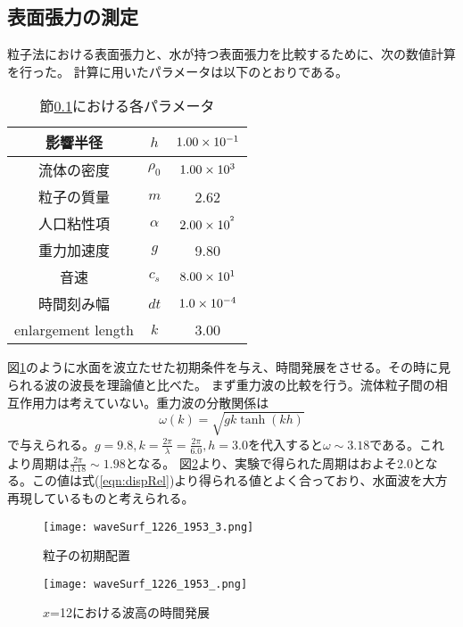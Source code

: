 \documentclass[]{jsarticle}
\begin{document}
\subsection{表面張力の測定}
\label{subsec:surfaceCoef}
粒子法における表面張力と、水が持つ表面張力を比較するために、次の数値計算を行った。
計算に用いたパラメータは以下のとおりである。
\begin{table}[h]
  \caption{節\ref{subsec:surfaceCoef}における各パラメータ}
  \begin{center}
    \begin{tabular}{|c|c|c|}\hline
      影響半径&$h$&$\rm{1.00\times10^{-1}}$ \\ \hline
      流体の密度&$\rho_0$&$\rm{1.00\times10^3}$ \\ \hline
      粒子の質量&$m$&2.62 \\ \hline
      人口粘性項&$\alpha$&$\rm{2.00\times10^{^2}}$ \\ \hline
      重力加速度&$g$&9.80 \\ \hline
      音速&$c_s$&$\rm{8.00\times10^1}$ \\ \hline
      時間刻み幅&$dt$&$\rm{1.0\times10^{-4}}$ \\ \hline
      enlargement length&$k$&3.00 \\ \hline
    \end{tabular}
  \end{center}
\end{table}

図\ref{fig:waveSurfInit}のように水面を波立たせた初期条件を与え、時間発展をさせる。その時に見られる波の波長を理論値と比べた。
まず重力波の比較を行う。流体粒子間の相互作用力は考えていない。重力波の分散関係は
\begin{equation}
  \label{eqn:dispRel}
  \omega(k)=\sqrt{gk \tanh (kh)}
\end{equation}
で与えられる\cite{tatsumiKiso}。$g=9.8, k=\frac{2\pi}{\lambda}=\frac{2\pi}{6.0}, h=3.0$を代入すると$\omega\sim3.18$である。これより周期は$\frac{2\pi}{3.18}\sim1.98$となる。
図\ref{fig:waveSurfEvol}より、実験で得られた周期はおよそ2.0となる。この値は式(\ref{eqn:dispRel})より得られる値とよく合っており、水面波を大方再現しているものと考えられる。
\begin{figure}[H]
  \centering
  \texttt{[image: waveSurf\_1226\_1953\_3.png]}
  \caption{粒子の初期配置}
  \label{fig:waveSurfInit}
\end{figure}
\begin{figure}[H]
  \centering
  \texttt{[image: waveSurf\_1226\_1953\_.png]}
  \caption{$x$=12における波高の時間発展}
  \label{fig:waveSurfEvol}
\end{figure}
\end{document}
